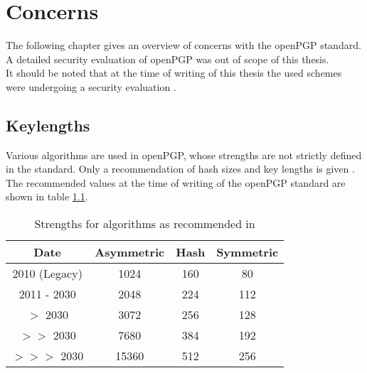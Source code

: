 \chapter{Concerns} \label{chapter:concerns}


The following chapter gives an overview of concerns with the openPGP standard.
A detailed security evaluation of openPGP was out of scope of this thesis. \\

It should be noted that at the time of writing of this thesis the used schemes were undergoing a security evaluation \citep{TUB2015}.



\section{Keylengths}

Various algorithms are used in openPGP, whose strengths are not strictly defined in the standard. 
Only a recommendation of hash sizes and key lengths is given \citep[section 14]{RFC4880}.
The recommended values at the time of writing of the openPGP standard are shown in table \ref{tab:keylengths}.

\begin{table}[h]
	\centering
	\begin{tabular}{|c|c|c|c|}
		\hline Date & 			Asymmetric & Hash & Symmetric \\ 
		\hline\hline 2010 (Legacy) & 1024 & 160 & 80 \\ 
		\hline 2011 - 2030 & 2048 & 224 & 112 \\ 
		\hline $>$ 2030 		   & 3072 & 256 & 128 \\ 
		\hline $>>$ 2030       & 7680 & 384 & 192 \\ 
		\hline $>>>$ 2030     & 15360 & 512 & 256 \\ 
		\hline 
	\end{tabular}
	\label{tab:keylengths}
	\caption{Strengths for algorithms as recommended in \citep[section 14]{RFC4880}} 
\end{table}

